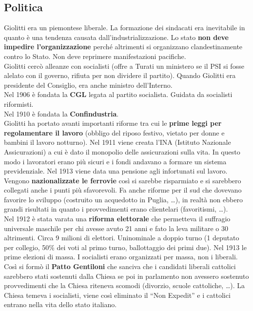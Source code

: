 \subsection{Politica}
Giolitti era un piemontese liberale. La formazione dei sindacati era inevitabile in quanto è una 
tendenza causata dall'industrializzazione. Lo stato \textbf{non deve impedire l'organizzazione}
perché altrimenti si organizzano clandestinamente contro lo Stato. Non deve reprimere manifestazioni
pacifiche.\\
Giolitti cercò alleanze con socialisti (offre a Turati un ministero se il PSI si fosse alelato con
il governo, rifiuta per non dividere il partito). Quando Giolitti era presidente del Consiglio, era
anche ministro dell'Interno.\\
Nel 1906 è fondata la \textbf{CGL} legata al partito socialista. Guidata da socialisti riformisti.\\
Nel 1910 è fondata la \textbf{Confindustria}.\\
Giolitti ha portato avanti importanti riforme tra cui le \textbf{prime leggi per regolamentare il 
lavoro} (obbligo del riposo festivo, vietato per donne e bambini il lavoro notturno). Nel 1911 viene 
creata l'INA (Istituto Nazionale Assicurazioni) a cui è dato il monopolio delle assicurazioni sulla 
vita. In questo modo i lavoratori erano più sicuri e i fondi andavano a formare un sistema 
previdenziale. Nel 1913 viene data una pensione agli infortunati sul lavoro.\\
Vengono \textbf{nazionalizzate le ferrovie} così si sarebbe risparmiato e si sarebbero collegati 
anche i punti più sfavorevoli. Fa anche riforme per il sud che dovevano favorire lo sviluppo
(costruito un acquedotto in Puglia, \ldots), in realtà non ebbero grandi risultati in quanto i
provvedimenti erano clientelari (favoritismi, \ldots).\\ [\baselineskip]
Nel 1912 è stata varata una \textbf{riforma elettorale} che permetteva il suffragio universale 
maschile per chi avesse avuto 21 anni e fato la leva militare o 30 altrimenti. Circa 9 milioni di
elettori. Uninominale a doppio turno (1 deputato per collegio, 50\% dei voti al primo turno, 
ballottaggio dei primi due). Nel 1913 le prime elezioni di massa. I socialisti erano organizzati per 
massa, non i liberali. Così si formò il \textbf{Patto Gentiloni} che sanciva che i candidati liberali
cattolici sarebbero stati sostenuti dalla Chiesa se poi in parlamento non avessero sostenuto 
provvedimenti che la Chiesa riteneva scomodi (divorzio, scuole cattoliche, \ldots). La Chiesa temeva
i socialisti, viene così eliminato il ``Non Expedit'' e i cattolici entrano nella vita dello stato
italiano.


